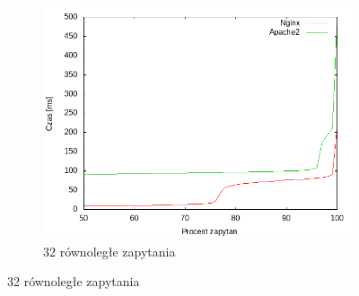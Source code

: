 \begin{figure}
\begin{subfigure}[h]{0.3\textwidth}
		\includegraphics[width=\textwidth]{testy/wybor_index_maly_32.png}
		\caption{32 równoległe zapytania}
	\end{subfigure}


\end{figure}
